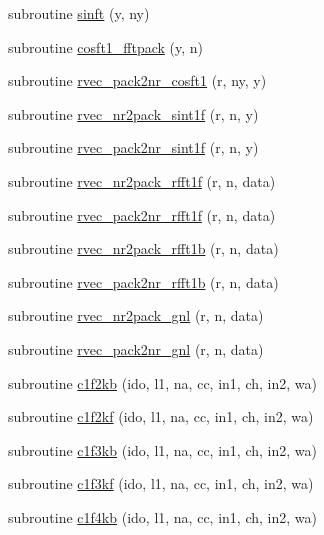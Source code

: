 \begin{DoxyCompactItemize}
\item 
subroutine \mbox{\hyperlink{namespacefftclass_abcd5ef700f07a29fa9949e15866f5d41}{sinft}} (y, ny)
\item 
subroutine \mbox{\hyperlink{namespacefftclass_ac4347b89b0b1a5894943daa3f37c54ee}{cosft1\+\_\+fftpack}} (y, n)
\item 
subroutine \mbox{\hyperlink{namespacefftclass_a8f3b38a9f0433b6b847b670b98acab99}{rvec\+\_\+pack2nr\+\_\+cosft1}} (r, ny, y)
\item 
subroutine \mbox{\hyperlink{namespacefftclass_ae1f9bdd4e66db530852187dff115ae36}{rvec\+\_\+nr2pack\+\_\+sint1f}} (r, n, y)
\item 
subroutine \mbox{\hyperlink{namespacefftclass_a667b3d13eccd40bf9e60f379f6d44e04}{rvec\+\_\+pack2nr\+\_\+sint1f}} (r, n, y)
\item 
subroutine \mbox{\hyperlink{namespacefftclass_ac09ed442a8bb7846768adbe2d5c798c6}{rvec\+\_\+nr2pack\+\_\+rfft1f}} (r, n, data)
\item 
subroutine \mbox{\hyperlink{namespacefftclass_ac898bf50e64ca8c43e8d9fa0c2c85919}{rvec\+\_\+pack2nr\+\_\+rfft1f}} (r, n, data)
\item 
subroutine \mbox{\hyperlink{namespacefftclass_a78a858cc72da790e88dc826f5bdd14b3}{rvec\+\_\+nr2pack\+\_\+rfft1b}} (r, n, data)
\item 
subroutine \mbox{\hyperlink{namespacefftclass_a49a850047c36eff6fb6d5eb1669cb009}{rvec\+\_\+pack2nr\+\_\+rfft1b}} (r, n, data)
\item 
subroutine \mbox{\hyperlink{namespacefftclass_a2c47e8aa546c8ea9f5f23219be52d57e}{rvec\+\_\+nr2pack\+\_\+gnl}} (r, n, data)
\item 
subroutine \mbox{\hyperlink{namespacefftclass_a5b968c02330134b7f60b0b19e3192e77}{rvec\+\_\+pack2nr\+\_\+gnl}} (r, n, data)
\item 
subroutine \mbox{\hyperlink{namespacefftclass_a5b4381756639205cdda3aa66b4d3e98c}{c1f2kb}} (ido, l1, na, cc, in1, ch, in2, wa)
\item 
subroutine \mbox{\hyperlink{namespacefftclass_a0535bb9fc14fda824be9053638cdfb2a}{c1f2kf}} (ido, l1, na, cc, in1, ch, in2, wa)
\item 
subroutine \mbox{\hyperlink{namespacefftclass_af43eb54e0a7553e31585e67ad240b860}{c1f3kb}} (ido, l1, na, cc, in1, ch, in2, wa)
\item 
subroutine \mbox{\hyperlink{namespacefftclass_ae586c2f39848274e0454c7d161522c31}{c1f3kf}} (ido, l1, na, cc, in1, ch, in2, wa)
\item 
subroutine \mbox{\hyperlink{namespacefftclass_a16b67c4056cd4bef03d70d6289f60954}{c1f4kb}} (ido, l1, na, cc, in1, ch, in2, wa)

\end{DoxyCompactItemize}

